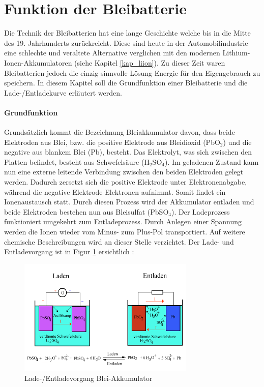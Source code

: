 \section{Funktion der Bleibatterie}

Die Technik der Bleibatterien hat eine lange Geschichte welche bis in die Mitte des 19. Jahrhunderts zurückreicht. Diese sind heute in der Automobilindustrie eine schlechte und veraltete Alternative verglichen mit den modernen Lithium-Ionen-Akkumulatoren (siehe Kapitel \ref{kap_liion}). Zu dieser Zeit waren Bleibatterien jedoch die einzig sinnvolle Lösung Energie für den Eigengebrauch zu speichern. In diesem Kapitel soll die Grundfunktion einer Bleibatterie und die Lade-/Entladekurve erläutert werden.

\paragraph{Grundfunktion}
Grundsätzlich kommt die Bezeichnung Bleiakkumulator davon, dass beide Elektroden aus Blei, bzw. die positive Elektrode aus Bleidioxid (PbO$_2$) und die negative aus blankem Blei (Pb), besteht. Das Elektrolyt, was sich zwischen den Platten befindet, besteht aus Schwefelsäure (H$_2$SO$_4$). Im geladenen Zustand kann nun eine externe leitende Verbindung zwischen den beiden Elektroden gelegt werden. Dadurch zersetzt sich die positive Elektrode unter Elektronenabgabe, während die negative Elektrode Elektronen aufnimmt. Somit findet ein Ionenaustausch statt. Durch diesen Prozess wird der Akkumulator entladen und beide Elektroden bestehen nun aus Bleisulfat (PbSO$_4$). Der Ladeprozess funktioniert umgekehrt zum Entladeprozess. Durch Anlegen einer Spannung werden die Ionen wieder vom Minus- zum Plus-Pol transportiert. Auf weitere chemische Beschreibungen wird an dieser Stelle verzichtet. Der Lade- und Entladevorgang ist in Figur \ref{fig:pb_akku} ersichtlich \cite{pb_akku_funktion}:

\begin{figure}[h!]
	\centering
		\includegraphics[width=0.75\textwidth]{images/pb_akku.PNG}
	\caption{Lade-/Entladevorgang Blei-Akkumulator \cite{pb_akku_ent_lade}}
	\label{fig:pb_akku}
\end{figure}

